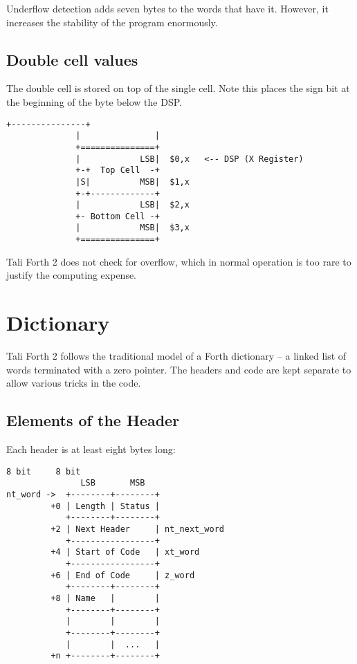 Underflow detection adds seven bytes 
to the words that have it. However, it increases the stability of the
program enormously.

\subsection{Double cell values}

The double cell is stored on top of the single cell.  Note this places the sign
bit at the beginning of the byte below the DSP.

\begin{lstlisting}[frame=single]
              +---------------+
              |               |  
              +===============+  
              |            LSB|  $0,x   <-- DSP (X Register) 
              +-+  Top Cell  -+         
              |S|          MSB|  $1,x
              +-+-------------+ 
              |            LSB|  $2,x
              +- Bottom Cell -+         
              |            MSB|  $3,x   
              +===============+ 
\end{lstlisting}

Tali Forth 2 does not check for overflow, which in normal
operation is too rare to justify the computing expense. 

\section{Dictionary}

Tali Forth 2 follows the traditional model of a Forth dictionary -- a linked list
of words terminated with a zero pointer. The headers and code are kept separate
to allow various tricks in the code.


\subsection{Elements of the Header}

Each header is at least eight bytes long:

\begin{lstlisting}[frame=single]
              8 bit     8 bit
               LSB       MSB
nt_word ->  +--------+--------+
         +0 | Length | Status |
            +--------+--------+
         +2 | Next Header     | nt_next_word
            +-----------------+
         +4 | Start of Code   | xt_word 
            +-----------------+
         +6 | End of Code     | z_word
            +--------+--------+
         +8 | Name   |        |
            +--------+--------+
            |        |        |
            +--------+--------+
            |        |  ...   |
         +n +--------+--------+
\end{lstlisting}

